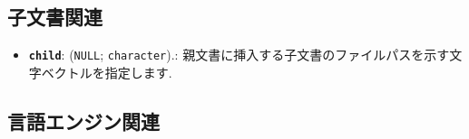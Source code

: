 \documentclass[
]{bxjsreport}
\providecommand{\tightlist}{%
  \setlength{\itemsep}{0pt}\setlength{\parskip}{0pt}}
\begin{document}
\hypertarget{child-document}{%
\subsection{子文書関連}\label{child-document}}

\begin{itemize}
\tightlist
\item
  \textbf{\texttt{child}}: (\texttt{NULL}; \texttt{character}).:
  親文書に挿入する子文書のファイルパスを示す文字ベクトルを指定します.
\end{itemize}

\hypertarget{engine}{%
\subsection{言語エンジン関連}\label{engine}}
\end{document}
